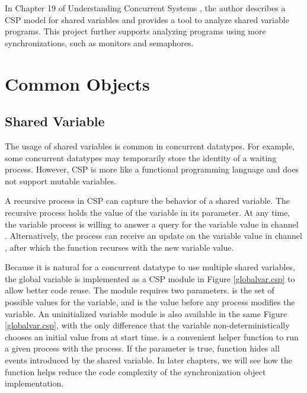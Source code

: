 \documentclass[a4paper, 12pt]{article}
\begin{document}
In Chapter 19 of Understanding Concurrent Systems \cite{ucs-book}, the author describes a CSP model for shared variables and provides a tool to analyze shared variable programs. This project further supports analyzing programs using more synchronizations, such as monitors and semaphores.

\newpage
\section{Common Objects}
\subsection{Shared Variable}
The usage of shared variables is common in concurrent datatypes. For example, some concurrent datatypes may temporarily store the identity of a waiting process. However, CSP is more like a functional programming language and does not support mutable variables. 

A recursive process in CSP can capture the behavior of a shared variable. The recursive process holds the value of the variable in its parameter. At any time, the variable process is willing to answer a query for the variable value in channel . Alternatively, the process can receive an update on the variable value in channel , after which the function recurses with the new variable value.

Because it is natural for a concurrent datatype to use multiple shared variables, the global variable is implemented as a CSP module in Figure \ref{globalvar.csp} to allow better code reuse. The module requires two parameters.  is the set of possible values for the variable, and  is the value before any process modifies the variable. An uninitialized variable module is also available in the same Figure \ref{globalvar.csp}, with the only difference that the variable non-deterministically chooses an initial value from  at start time.  is a convenient helper function to run a given process  with the  process. If the parameter  is true,  function hides all events introduced by the shared variable. In later chapters, we will see how the  function helps reduce the code complexity of the synchronization object implementation.
\end{document}
